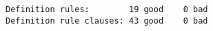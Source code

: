 \documentclass[11pt]{article}
\begin{document}
\ottall

\begin{verbatim}
Definition rules:        19 good    0 bad
Definition rule clauses: 43 good    0 bad
\end{verbatim}
\end{document}

